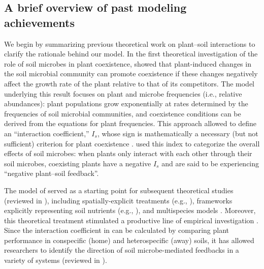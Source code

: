 \subsection{A brief overview of past modeling achievements}
We begin by summarizing previous theoretical work on plant--soil interactions to clarify the rationale behind our model.
In the first theoretical investigation of the role of soil microbes in plant coexistence, \citet{Bever1997} showed that plant-induced changes in the soil microbial community can promote coexistence if these changes negatively affect the growth rate of the plant relative to that of its competitors.
The model underlying this result focuses on plant and microbe frequencies (i.e., relative abundances): plant populations grow exponentially at rates determined by the frequencies of soil microbial communities, and coexistence conditions can be derived from the equations for plant frequencies. This approach allowed \citet{Bever1997} to define an ``interaction coefficient,'' $I_{s}$, whose sign is mathematically a necessary (but not sufficient) criterion for plant coexistence \citep{Revilla2013, KeMiki2015}.
\citet{Bever1997} used this index to categorize the overall effects of soil microbes: when plants only interact with each other through their soil microbes, coexisting plants have a negative $I_{s}$ and are said to be experiencing ``negative plant--soil feedback''.
\par


The model of \citet{Bever1997} served as a starting point for subsequent theoretical studies (reviewed in \citealt{Bever2010, KeMiki2015}), including spatially-explicit treatments (e.g., \citealt{Eppinga2006}), frameworks explicitly representing soil nutrients (e.g., \citealt{Umbanhowar2005}), and multispecies models \citep{Kulmatiski2011, Eppinga2018}. Moreover, this theoretical treatment stimulated a productive line of empirical investigation \citep{Kulmatiski2008, vanderPutten2013}. Since the interaction coefficient in \citet{Bever1997} can be calculated by comparing plant performance in conspecific (home) and heterospecific (away) soils, it has allowed researchers to identify the direction of soil microbe-mediated feedbacks in a variety of systems (reviewed in \citealt{Bever2010, vanderPutten2013, Bever2015}).
\par


